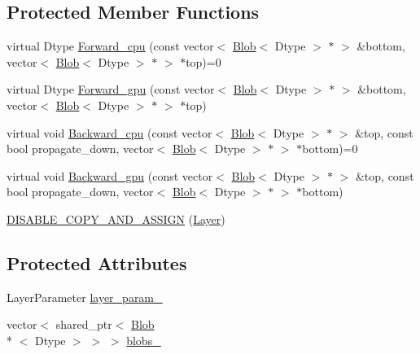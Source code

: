 \subsection*{Protected Member Functions}
\begin{DoxyCompactItemize}
\item 
virtual Dtype \hyperlink{classcaffe_1_1_layer_a8f7f61da3b8b3ca7f2394dee33873353}{Forward\+\_\+cpu} (const vector$<$ \hyperlink{classcaffe_1_1_blob}{Blob}$<$ Dtype $>$ $\ast$ $>$ \&bottom, vector$<$ \hyperlink{classcaffe_1_1_blob}{Blob}$<$ Dtype $>$ $\ast$ $>$ $\ast$top)=0
\item 
virtual Dtype \hyperlink{classcaffe_1_1_layer_a2d78dbf5d8bc36928bd8f6fcfbafbcef}{Forward\+\_\+gpu} (const vector$<$ \hyperlink{classcaffe_1_1_blob}{Blob}$<$ Dtype $>$ $\ast$ $>$ \&bottom, vector$<$ \hyperlink{classcaffe_1_1_blob}{Blob}$<$ Dtype $>$ $\ast$ $>$ $\ast$top)
\item 
virtual void \hyperlink{classcaffe_1_1_layer_ac2d82011d076237c67997f63e7ee4b80}{Backward\+\_\+cpu} (const vector$<$ \hyperlink{classcaffe_1_1_blob}{Blob}$<$ Dtype $>$ $\ast$ $>$ \&top, const bool propagate\+\_\+down, vector$<$ \hyperlink{classcaffe_1_1_blob}{Blob}$<$ Dtype $>$ $\ast$ $>$ $\ast$bottom)=0
\item 
virtual void \hyperlink{classcaffe_1_1_layer_adf07ffe1f22d2fd2b1b0ff475ef5a64b}{Backward\+\_\+gpu} (const vector$<$ \hyperlink{classcaffe_1_1_blob}{Blob}$<$ Dtype $>$ $\ast$ $>$ \&top, const bool propagate\+\_\+down, vector$<$ \hyperlink{classcaffe_1_1_blob}{Blob}$<$ Dtype $>$ $\ast$ $>$ $\ast$bottom)
\item 
\hyperlink{classcaffe_1_1_layer_a90730e177e4b3b3516b1b69ba2f6b06a}{D\+I\+S\+A\+B\+L\+E\+\_\+\+C\+O\+P\+Y\+\_\+\+A\+N\+D\+\_\+\+A\+S\+S\+I\+G\+N} (\hyperlink{classcaffe_1_1_layer}{Layer})
\end{DoxyCompactItemize}
\subsection*{Protected Attributes}
\begin{DoxyCompactItemize}
\item 
Layer\+Parameter \hyperlink{classcaffe_1_1_layer_a7ed12bb2df25c887e41d7ea9557fc701}{layer\+\_\+param\+\_\+}
\item 
vector$<$ shared\+\_\+ptr$<$ \hyperlink{classcaffe_1_1_blob}{Blob}\\*
$<$ Dtype $>$ $>$ $>$ \hyperlink{classcaffe_1_1_layer_a8073fcf2c139b47eb99ce71b346b1321}{blobs\+\_\+}
\end{DoxyCompactItemize}


